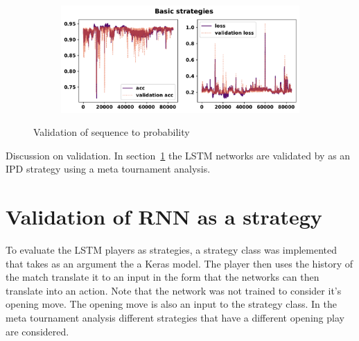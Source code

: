 \begin{figure}[!htbp]
\begin{subfigure}{\textwidth}
    \end{subfigure}
    \begin{subfigure}{\textwidth}
    \centering
    \includegraphics[width=.8\textwidth]{src/chapters/07/img/validation_plot_classification_basic_strategies.pdf}
    \end{subfigure}
    \caption{Validation of sequence to probability}\label{fig:validation_sequence_to_probability}
\end{figure}

Discussion on validation. In section~\ref{section:rnn_strategy_validation} the
LSTM networks are validated by as an IPD strategy using a meta tournament
analysis.

\section{Validation of RNN as a strategy}\label{section:rnn_strategy_validation}

To evaluate the LSTM players as strategies, a strategy class was implemented
that takes as an argument the a Keras model. The player then uses the history
of the match translate it to an input in the form that the networks can then
translate into an action. Note that the network was not trained to consider
it's opening move. The opening move is also an input to the strategy class.
In the meta tournament analysis different strategies that have a different
opening play are considered.

